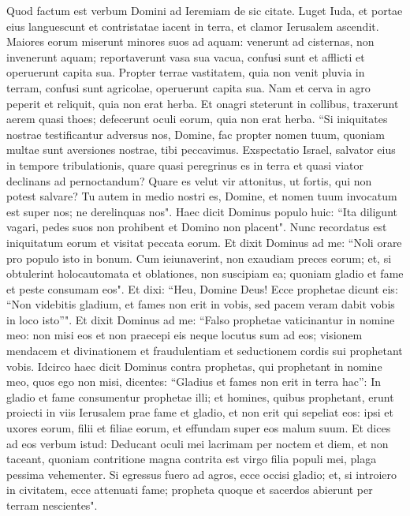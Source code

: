 \begin{biblechapter}  
\verse Quod factum est verbum Domini ad Ieremiam de sic citate. 
\verse Luget Iuda, et portae eius languescunt et contristatae iacent in terra, et clamor Ierusalem ascendit. 
\verse Maiores eorum miserunt minores suos ad aquam: venerunt ad cisternas, non invenerunt aquam; reportaverunt vasa sua vacua, confusi sunt et afflicti et operuerunt capita sua. 
\verse Propter terrae vastitatem, quia non venit pluvia in terram, confusi sunt agricolae, operuerunt capita sua. 
\verse Nam et cerva in agro peperit et reliquit, quia non erat herba. 
\verse Et onagri steterunt in collibus, traxerunt aerem quasi thoes; defecerunt oculi eorum, quia non erat herba. 
\verse “Si iniquitates nostrae testificantur adversus nos, Domine, fac propter nomen tuum, quoniam multae sunt aversiones nostrae, tibi peccavimus. 
\verse Exspectatio Israel, salvator eius in tempore tribulationis, quare quasi peregrinus es in terra et quasi viator declinans ad pernoctandum? 
\verse Quare es velut vir attonitus, ut fortis, qui non potest salvare? Tu autem in medio nostri es, Domine, et nomen tuum invocatum est super nos; ne derelinquas nos". 
\verse Haec dicit Dominus populo huic: “Ita diligunt vagari, pedes suos non prohibent et Domino non placent". Nunc recordatus est iniquitatum eorum et visitat peccata eorum. 
\verse Et dixit Dominus ad me: “Noli orare pro populo isto in bonum. 
\verse Cum ieiunaverint, non exaudiam preces eorum; et, si obtulerint holocautomata et oblationes, non suscipiam ea; quoniam gladio et fame et peste consumam eos". 
\verse Et dixi: “Heu, Domine Deus! Ecce prophetae dicunt eis: “Non videbitis gladium, et fames non erit in vobis, sed pacem veram dabit vobis in loco isto”". 
\verse Et dixit Dominus ad me: “Falso prophetae vaticinantur in nomine meo: non misi eos et non praecepi eis neque locutus sum ad eos; visionem mendacem et divinationem et fraudulentiam et seductionem cordis sui prophetant vobis. 
\verse Idcirco haec dicit Dominus contra prophetas, qui prophetant in nomine meo, quos ego non misi, dicentes: “Gladius et fames non erit in terra hac”: In gladio et fame consumentur prophetae illi; 
\verse et homines, quibus prophetant, erunt proiecti in viis Ierusalem prae fame et gladio, et non erit qui sepeliat eos: ipsi et uxores eorum, filii et filiae eorum, et effundam super eos malum suum. 
\verse Et dices ad eos verbum istud: Deducant oculi mei lacrimam per noctem et diem, et non taceant, quoniam contritione magna contrita est virgo filia populi mei, plaga pessima vehementer. 
\verse Si egressus fuero ad agros, ecce occisi gladio; et, si introiero in civitatem, ecce attenuati fame; propheta quoque et sacerdos abierunt per terram nescientes". 

\end{biblechapter}
